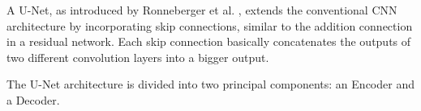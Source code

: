 \documentclass[12pt]{article}
\begin{document}
A U-Net, as introduced by Ronneberger et al. \cite{ronneberger2015unet}, extends the conventional CNN architecture by incorporating skip connections, 
similar to the addition connection in a residual network. 
Each skip connection basically concatenates the outputs of two different convolution layers into a bigger output.















The U-Net architecture is divided into two principal components: an Encoder and a Decoder. 
\end{document}

